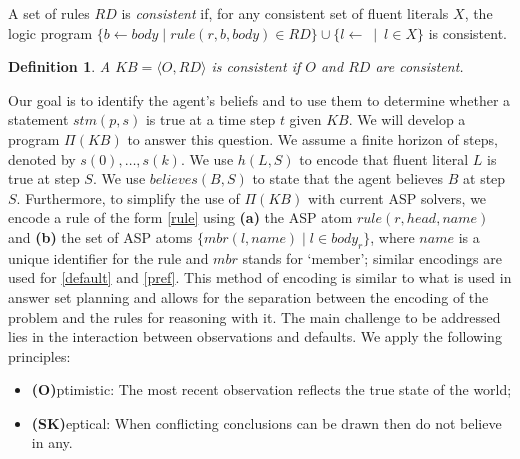 \documentclass{article}
\newtheorem{definition}{Definition}
\begin{document}
A set of rules $RD$ is \emph{consistent} if, for any consistent set of fluent literals $X$, the logic program 
$\{b \leftarrow body  \mid rule(r, b, body) \in RD\} \cup \{l \leftarrow \:\mid\: l\in X\}$
is consistent.
%
\begin{definition}
A $KB = \langle O, RD \rangle$ is \emph{consistent} if $O$ and $RD$ are consistent. 
\end{definition} 
%
Our goal is to identify the agent's beliefs and to use them to determine whether  a statement $stm(p, s)$ is true at a time step $t$ given $KB$. We will develop a program $\Pi(KB)$ to answer this question. We assume a finite horizon of steps, denoted by $s(0), \ldots, s(k)$. We use $h(L,S)$ to encode that fluent literal $L$ is true at step $S$. We use $believes(B,S)$ to state that the agent believes $B$ at step $S$. Furthermore, to simplify the use of $\Pi(KB)$ with current ASP solvers, we  encode a rule of the form \eqref{rule}  using {\bf (a)} the ASP atom $rule(r, head, name)$ and
{\bf (b)} the set of ASP atoms $\{mbr(l, name) \mid l \in body_{r}\}$, where \(name\) is a unique identifier for the rule and $mbr$ stands for `member'; similar encodings are used for  \eqref{default} and \eqref{pref}. 
This method of encoding is similar to what is used  in answer set planning and allows for the separation between  the encoding of the problem and the rules for reasoning with it.
The main challenge to be addressed lies in the interaction between observations and defaults. 
We apply the following principles:
%
\begin{itemize}
\item[]{\bf (O)}ptimistic: The most recent observation reflects the true state of the world;
\item[]{\bf (SK)}eptical: When conflicting conclusions can be drawn then do not believe in any.
\end{itemize}  

\end{document}
